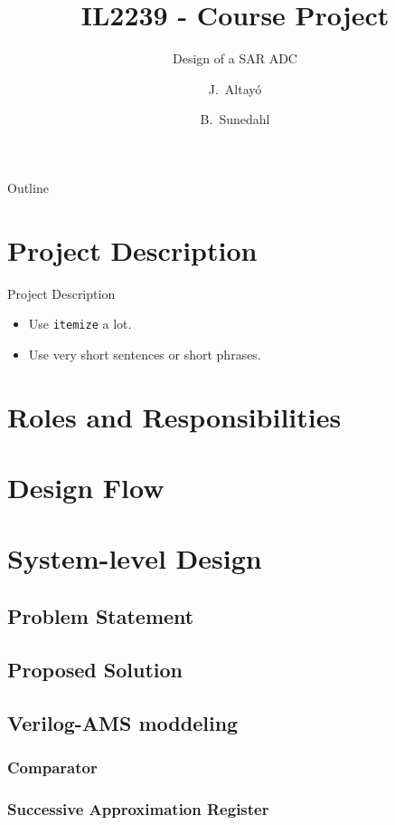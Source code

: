 \documentclass{beamer}
\title{IL2239 - Course Project}
\subtitle{Design of a SAR ADC}
\author{J.~Altayó \and B.~Sunedahl}
\begin{document}
 
 \begin{frame}[plain, t]
  \titlepage
 \end{frame}
 
 \begin{frame}{Outline}
    \begin{multicols}{2}
        \tableofcontents
    \end{multicols}
 \end{frame}
 
 \section{Project Description}
 
 \begin{frame}{Project Description}
  \begin{itemize}
   \item Use \texttt{itemize} a lot.
   \item Use very short sentences or short phrases.
  \end{itemize}
 \end{frame}
 
 \section{Roles and Responsibilities}
 \section{Design Flow}
 \section{System-level Design}
 \subsection{Problem Statement}
 \subsection{Proposed Solution}
 \subsection{Verilog-AMS moddeling}
 \subsubsection{Comparator}
 \subsubsection{Successive Approximation Register}
\end{document}
